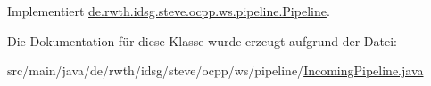 Implementiert \hyperlink{interfacede_1_1rwth_1_1idsg_1_1steve_1_1ocpp_1_1ws_1_1pipeline_1_1_pipeline_ae76e604bfd84862f5491c81508326b6e}{de.\-rwth.\-idsg.\-steve.\-ocpp.\-ws.\-pipeline.\-Pipeline}.



Die Dokumentation für diese Klasse wurde erzeugt aufgrund der Datei\-:\begin{DoxyCompactItemize}
\item 
src/main/java/de/rwth/idsg/steve/ocpp/ws/pipeline/\hyperlink{_incoming_pipeline_8java}{Incoming\-Pipeline.\-java}\end{DoxyCompactItemize}
